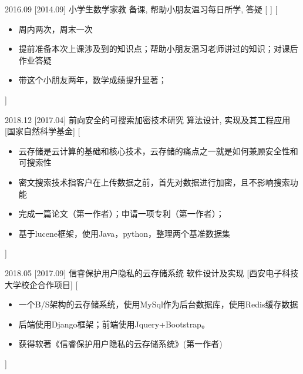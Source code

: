 \documentclass[zh]{resume}
\begin{document}
\begin{experiences}

  \experience
    {2016.09}%
    [2014.09]%
    {小学生数学家教}%
    {备课, 帮助小朋友温习每日所学, 答疑}%
    [ ]%
    [\begin{itemize}
      \item{\icon{\faFlag}} 周内两次，周末一次
      \item{\icon{\faFlag}} 提前准备本次上课涉及到的知识点；帮助小朋友温习老师讲过的知识；对课后作业答疑
      \item{\icon{\faCheck}} 带这个小朋友两年，数学成绩提升显著；%
    \end{itemize}]%

  \separator{0.2em}

  \experience
    {2018.12}%
    [2017.04]%
    {前向安全的可搜索加密技术研究}%
    {算法设计, 实现及其工程应用}%
    [国家自然科学基金]%
    [\begin{itemize}
      \item{\icon{\faFlag}} 云存储是云计算的基础和核心技术，云存储的痛点之一就是如何兼顾安全性和可搜索性
      \item{\icon{\faFlag}} 密文搜索技术指客户在上传数据之前，首先对数据进行加密，且不影响搜索功能
      \item{\icon{\faCheck}} 完成一篇论文（第一作者）；申请一项专利（第一作者）；
      \item{\icon{\faCheck}} 基于lucene框架，使用Java，python，整理两个基准数据集  %
    \end{itemize}]%

  \separator{0.2em}

  \experience
    {2018.05}%
    [2017.09]%
    {信睿保护用户隐私的云存储系统}%
    {软件设计及实现}%
    [西安电子科技大学校企合作项目]%
    [\begin{itemize}
      \item{\icon{\faFlag}} 一个B/S架构的云存储系统，使用MySql作为后台数据库，使用Redis缓存数据
      \item{\icon{\faFlag}} 后端使用Django框架；前端使用Jquery+Bootstrap。
      \item{\icon{\faCheck}} 获得软著《信睿保护用户隐私的云存储系统》(第一作者)
    \end{itemize}]%


\end{experiences}
\end{document}
